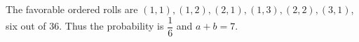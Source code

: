 The favorable ordered rolls are $(1,1),(1,2),(2,1),(1,3),(2,2),(3,1)$, six out of $36$. Thus the probability is $\dfrac{1}{6}$ and $\boxed{a+b=7}$.
